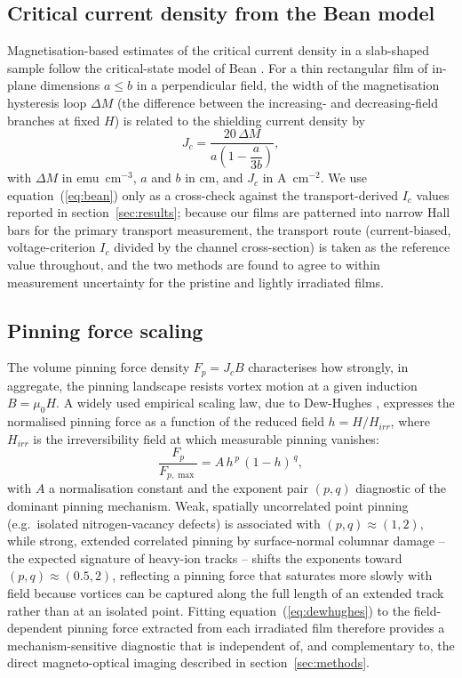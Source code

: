 \subsection{Critical current density from the Bean model}
Magnetisation-based estimates of the critical current density in a slab-shaped sample follow the critical-state model of Bean \cite{bean1962}. For a thin rectangular film of in-plane dimensions $a\le b$ in a perpendicular field, the width of the magnetisation hysteresis loop $\Delta M$ (the difference between the increasing- and decreasing-field branches at fixed $H$) is related to the shielding current density by
\begin{equation}
J_c = \frac{20\,\Delta M}{a\left(1-\dfrac{a}{3b}\right)},
\label{eq:bean}
\end{equation}
with $\Delta M$ in emu~cm$^{-3}$, $a$ and $b$ in cm, and $J_c$ in A~cm$^{-2}$. We use equation~(\ref{eq:bean}) only as a cross-check against the transport-derived $I_c$ values reported in section~\ref{sec:results}; because our films are patterned into narrow Hall bars for the primary transport measurement, the transport route (current-biased, voltage-criterion $I_c$ divided by the channel cross-section) is taken as the reference value throughout, and the two methods are found to agree to within measurement uncertainty for the pristine and lightly irradiated films.

\subsection{Pinning force scaling}
The volume pinning force density $F_p = J_c B$ characterises how strongly, in aggregate, the pinning landscape resists vortex motion at a given induction $B=\mu_0 H$. A widely used empirical scaling law, due to Dew-Hughes \cite{dewhughes1974}, expresses the normalised pinning force as a function of the reduced field $h = H/H_{irr}$, where $H_{irr}$ is the irreversibility field at which measurable pinning vanishes:
\begin{equation}
\frac{F_p}{F_{p,\max}} = A\,h^{\,p}\,(1-h)^{\,q},
\label{eq:dewhughes}
\end{equation}
with $A$ a normalisation constant and the exponent pair $(p,q)$ diagnostic of the dominant pinning mechanism. Weak, spatially uncorrelated point pinning (e.g.\ isolated nitrogen-vacancy defects) is associated with $(p,q)\approx(1,2)$, while strong, extended correlated pinning by surface-normal columnar damage -- the expected signature of heavy-ion tracks -- shifts the exponents toward $(p,q)\approx(0.5,2)$, reflecting a pinning force that saturates more slowly with field because vortices can be captured along the full length of an extended track rather than at an isolated point. Fitting equation~(\ref{eq:dewhughes}) to the field-dependent pinning force extracted from each irradiated film therefore provides a mechanism-sensitive diagnostic that is independent of, and complementary to, the direct magneto-optical imaging described in section~\ref{sec:methods}.
